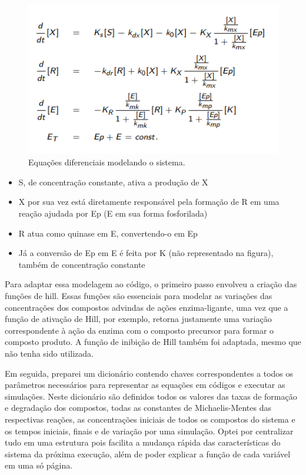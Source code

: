 \documentclass[brazilian,12pt,a4paper,final]{article}
\begin{document}
	\begin{figure}[hbtp]
		\begin{center}
			\includegraphics[]{Equações.png}
			\caption{Equações diferenciais modelando o sistema.}
			\label{fig}
		\end{center}
	\end{figure}
	
	\begin{itemize}
		\item S, de concentração constante, ativa a produção de X
		\item X por sua vez está diretamente responsável pela formação de R em uma reação ajudada por Ep (E em sua forma fosforilada)
		\item R atua como quinase em E, convertendo-o em Ep
		\item Já a conversão de Ep em E é feita por K (não representado na figura), também de concentração constante
	\end{itemize}
	
	Para adaptar essa modelagem ao código, o primeiro passo envolveu a criação das funções de hill. Essas funções são essenciais para modelar as variações das concentrações dos compostos advindas de ações enzima-ligante, uma vez que a função de ativação de Hill, por exemplo, retorna justamente uma variação correspondente à ação da enzima com o composto precursor para formar o composto produto. A função de inibição de Hill também foi adaptada, mesmo que não tenha sido utilizada.
	\vspace{0.5cm}
	
	Em seguida, preparei um dicionário contendo chaves correspondentes a todos os parâmetros necessários para representar as equações em códigos e executar as simulações. Neste dicionário são definidos todos os valores das taxas de formação e degradação dos compostos, todas as constantes de Michaelis-Mentes das respectivas reações, as concentrações iniciais de todos os compostos do sistema e os tempos iniciais, finais e de variação por uma simulação. Optei por centralizar tudo em uma estrutura pois facilita a mudança rápida das características do sistema da próxima execução, além de poder explicar a função de cada variável em uma só página.
	\vspace{0.5cm}
	
\end{document}
